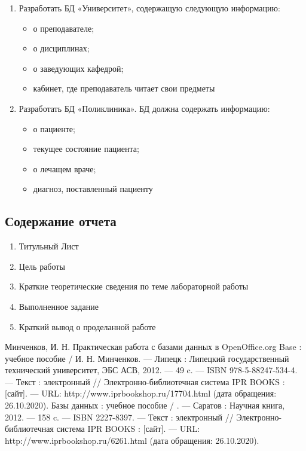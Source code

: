 \documentclass[a4paper]{article}
\begin{document}
\begin{enumerate}
  \item Разработать БД «Университет», содержащую следующую информацию:
    \begin{itemize}
        \item о преподавателе;
        \item о дисциплинах;
        \item о заведующих кафедрой;
        \item кабинет, где преподаватель читает свои предметы
    \end{itemize}


  \item Разработать БД «Поликлиника». БД должна содержать информацию:
    \begin{itemize}
        \item о пациенте;
        \item текущее состояние пациента;
        \item о лечащем враче;
        \item диагноз, поставленный пациенту
    \end{itemize}


\end{enumerate}

\subsection{Содержание отчета}
\begin{enumerate}
  \item Титульный Лист
  \item Цель работы
  \item Краткие теоретические сведения по теме лабораторной работы
  \item Выполненное задание
  \item Краткий вывод о проделанной работе
\end{enumerate}

\begin{thebibliography}{3}
Минченков, И. Н. Практическая работа с базами данных в OpenOffice.org Base : учебное пособие / И.
Н. Минченков. — Липецк : Липецкий государственный технический университет, ЭБС АСВ, 2012. — 49 c. — ISBN 978-5-88247-534-4. — Текст : электронный // Электронно-библиотечная система IPR BOOKS : [сайт]. — URL: http://www.iprbookshop.ru/17704.html (дата обращения: 26.10.2020).
Базы данных : учебное пособие / . — Саратов : Научная книга, 2012. — 158 c. — ISBN 2227-8397. — Текст : электронный // Электронно-библиотечная система IPR BOOKS : [сайт]. — URL: http://www.iprbookshop.ru/6261.html (дата обращения: 26.10.2020).
\end{thebibliography}
\end{document}
